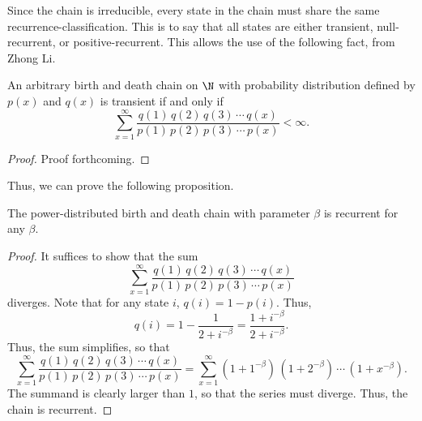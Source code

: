 Since the chain is irreducible, every state in the chain must share the same recurrence-classification.
This is to say that all states are either transient, null-recurrent, or positive-recurrent. This allows
the use of the following fact, from Zhong Li.
\begin{proposition}
    An arbitrary birth and death chain on $\N$ with probability distribution defined by $p(x)$ and
    $q(x)$ is transient if and only if
    \[
        \sum_{x = 1}^{\infty} \frac{q(1)\,q(2)\,q(3)\,\cdots\,q(x)}{p(1)\,p(2)\,p(3)\,\cdots\,p(x)} <
        \infty.  
    \]
\end{proposition}
\begin{proof}
    Proof forthcoming.
\end{proof}

Thus, we can prove the following proposition.
\begin{proposition}
    The power-distributed birth and death chain with parameter $\beta$ is recurrent for any $\beta$.
\end{proposition}
\begin{proof}
    It suffices to show that the sum
    \[
        \sum_{x = 1}^{\infty} \frac{q(1)\,q(2)\,q(3)\,\cdots\,q(x)}{p(1)\,p(2)\,p(3)\,\cdots\,p(x)}
    \]
    diverges. Note that for any state $i$, $q(i) = 1-p(i)$. Thus,
    \[
        q(i) = 1 - \frac{1}{2 + i^{-\beta}} = \frac{1 + i^{-\beta}}{2 + i^{-\beta}}.  
    \]
    Thus, the sum simplifies, so that
    \[
        \sum_{x = 1}^{\infty} \frac{q(1)\,q(2)\,q(3)\,\cdots\,q(x)}{p(1)\,p(2)\,p(3)\,\cdots\,p(x)} =
        \sum_{x = 1}^{\infty} (1+1^{-\beta})\,(1+2^{-\beta})\,\cdots\,(1 + x^{-\beta}).
    \]
    The summand is clearly larger than $1$, so that the series must diverge. Thus, the chain is
    recurrent.
\end{proof}

